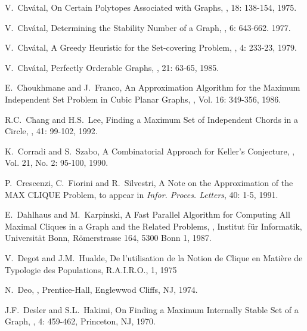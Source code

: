 \begin{thebibliography}{10}
V.~Chv\'{a}tal,
\newblock On Certain Polytopes Associated with Graphs,
, 18: 138-154, 1975.

V.~Chv\'{a}tal,
\newblock Determining the Stability Number of a Graph,
, 6: 643-662. 1977.

V.~Chv\'{a}tal,
\newblock A Greedy Heuristic for the Set-covering Problem,
, 4: 233-23, 1979.

V.~Chv\'{a}tal,
\newblock Perfectly Orderable Graphs,
, 21: 63-65, 1985.

E.~Choukhmane and J.~Franco,
\newblock An Approximation Algorithm for the Maximum Independent Set
Problem in Cubic Planar Graphs,
, Vol. 16: 349-356, 1986.

R.C.~Chang and H.S.~Lee,
\newblock Finding a Maximum Set of Independent Chords in a Circle,
, 41: 99-102, 1992.

K.~Corradi and S.~Szabo,
\newblock A Combinatorial Approach for Keller's Conjecture,
, Vol. 21, No. 2:
95-100, 1990.

P.~Crescenzi, C.~Fiorini and R.~Silvestri,
\newblock A Note on the Approximation of the MAX CLIQUE Problem,
\newblock to appear in {\em Infor. Proces. Letters}, 40: 1-5, 1991.

E.~Dahlhaus and M.~Karpinski,
\newblock A Fast Parallel Algorithm for Computing All Maximal
Cliques in a Graph and the Related Problems,
, Institut f\"{u}r
Informatik, Universit\"{a}t Bonn, R\"{o}merstrasse 164, 5300 Bonn 1,
1987.

V.~Degot and J.M.~Hualde,
\newblock De l'utilisation de la Notion de Clique en Mati\`{e}re de
Typologie des Populations,
\newblock R.A.I.R.O., 1, 1975

N.~Deo,
,
\newblock Prentice-Hall, Englewwod Cliffs, NJ, 1974.

 J.F.~Desler and S.L.~Hakimi,
\newblock On Finding a Maximum Internally Stable Set of a Graph,
, 4: 459-462, Princeton, NJ, 1970.


\end{thebibliography}
